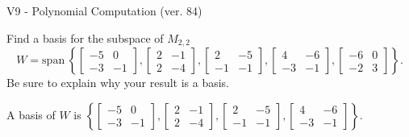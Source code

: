 \begin{exercise}
  \begin{exerciseTitle}V9 - Polynomial Computation (ver. 84)\end{exerciseTitle}
  \begin{exerciseStatement}
    Find a basis for the subspace of \(M_{2,2}\) 
\[W=\mathrm{span}\ \left\{\left[\begin{array}{cc}
-5 & 0 \\
-3 & -1
\end{array}\right] , \left[\begin{array}{cc}
2 & -1 \\
2 & -4
\end{array}\right] , \left[\begin{array}{cc}
2 & -5 \\
-1 & -1
\end{array}\right] , \left[\begin{array}{cc}
4 & -6 \\
-3 & -1
\end{array}\right] , \left[\begin{array}{cc}
-6 & 0 \\
-2 & 3
\end{array}\right]\right\}.\]
 Be sure to explain why your result is a basis.


  \end{exerciseStatement}
  \begin{exerciseAnswer}
   A basis of \(W\) is  \(\left\{\left[\begin{array}{cc}
-5 & 0 \\
-3 & -1
\end{array}\right] , \left[\begin{array}{cc}
2 & -1 \\
2 & -4
\end{array}\right] , \left[\begin{array}{cc}
2 & -5 \\
-1 & -1
\end{array}\right] , \left[\begin{array}{cc}
4 & -6 \\
-3 & -1
\end{array}\right]\right\}\).
  


  \end{exerciseAnswer}
\end{exercise}